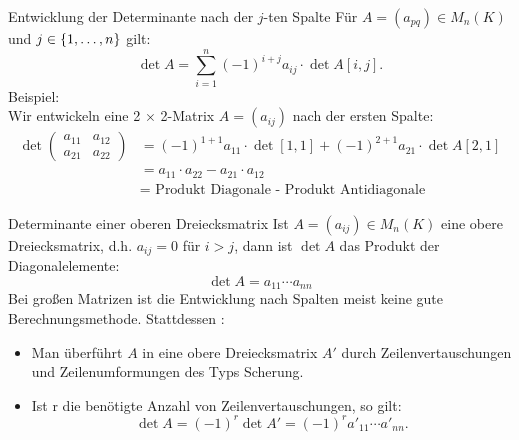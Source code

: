 \documentclass[main.tex]{subfiles}
\begin{document}
\begin{karte}{Entwicklung der Determinante nach der \(j\)-ten Spalte}
    Für \(A = (a_{pq}) \in M_n(K)\) und \(j \in \{1, \ldots ,n\}\) gilt:
    \[\det A = \sum_{i=1}^n(-1)^{i+j}a_{ij} \cdot \det A[i,j].\]
    Beispiel: \\
    Wir entwickeln eine 2 \(\times\) 2-Matrix \(A = (a_{ij})\) nach der
    ersten Spalte: 
    \[ \begin{split}
        \det 
        \begin{pmatrix}
        a_{11} & a_{12} \\
        a_{21} & a_{22}    
         \end{pmatrix} 
    & = (-1)^{1+1}a_{11} \cdot \det [1,1] + (-1)^{2+1}a_{21} \cdot \det A[2,1] \\
    & = a_{11} \cdot a_{22} - a_{21} \cdot a_{12}\\
    & = \text{ Produkt Diagonale - Produkt Antidiagonale}
    \end{split} 
    \]
\end{karte}
\begin{karte}{Determinante einer oberen Dreiecksmatrix} 
    Ist \(A = (a_{ij}) \in M_n(K)\) eine obere Dreiecksmatrix, d.h.
    \(a_{ij} = 0\) für \(i > j\), dann ist \(\det A\) das Produkt der 
    Diagonalelemente: 
    \[\det A = a_{11} \cdots a_{nn}\]
    Bei großen Matrizen ist die Entwicklung nach Spalten meist keine 
    gute Berechnungsmethode. Stattdessen : 
    \begin{itemize}
       \item Man überführt \(A\) in  eine obere Dreiecksmatrix 
       \(A'\) durch Zeilenvertauschungen und Zeilenumformungen des 
       Typs Scherung.
       \item Ist r die benötigte Anzahl von Zeilenvertauschungen, so gilt:
       \[\det A = (-1)^r \det A' = (-1)^r a'_{11} \cdots a'_{nn} .\]
    \end{itemize}
\end{karte}
\end{document}
